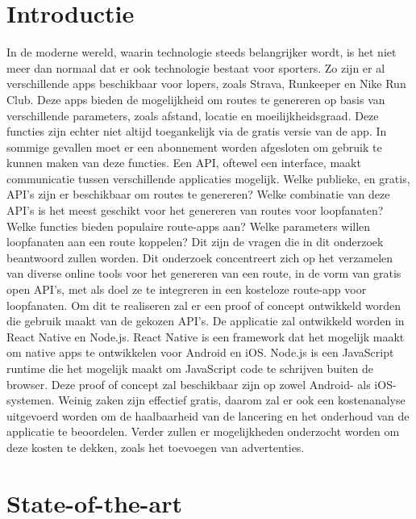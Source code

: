 
\section{Introductie}%
\label{sec:introductie}

In de moderne wereld,
waarin technologie steeds belangrijker wordt,
is het niet meer dan normaal dat er ook technologie bestaat voor sporters.
Zo zijn er al verschillende apps beschikbaar voor lopers, zoals Strava, Runkeeper en Nike Run Club.
Deze apps bieden de mogelijkheid om routes te genereren op basis van verschillende parameters, zoals afstand, locatie en moeilijkheidsgraad. Deze functies zijn echter niet altijd toegankelijk via de gratis versie van de app.
In sommige gevallen moet er een abonnement worden afgesloten om gebruik te kunnen maken van deze functies. Een API, oftewel een interface, maakt communicatie tussen verschillende applicaties mogelijk.
Welke publieke, en gratis, API's zijn er beschikbaar om routes te genereren? Welke combinatie van deze API's is het meest geschikt voor het genereren van routes voor loopfanaten? Welke functies bieden populaire route-apps aan? Welke parameters willen loopfanaten aan een route koppelen? Dit zijn de vragen die in dit onderzoek beantwoord zullen worden.
Dit onderzoek concentreert zich op het verzamelen van diverse online tools voor het genereren van een route, in de vorm van gratis open API's, met als doel ze te integreren in een kosteloze route-app voor loopfanaten.
Om dit te realiseren zal er een proof of concept ontwikkeld worden die gebruik maakt van de gekozen API's. De applicatie zal ontwikkeld worden in React Native en Node.js. React Native is een framework dat het mogelijk maakt om native apps te ontwikkelen voor Android en iOS\@. Node.js is een JavaScript runtime die het mogelijk maakt om JavaScript code te schrijven buiten de browser.
Deze proof of concept zal beschikbaar zijn op zowel Android- als iOS-systemen. Weinig zaken zijn effectief gratis, daarom zal er ook een kostenanalyse uitgevoerd worden om de haalbaarheid van de lancering en het onderhoud van de applicatie te beoordelen.
Verder zullen er mogelijkheden onderzocht worden om deze kosten te dekken, zoals het toevoegen van advertenties.



\section{State-of-the-art}%
\label{sec:state-of-the-art}

